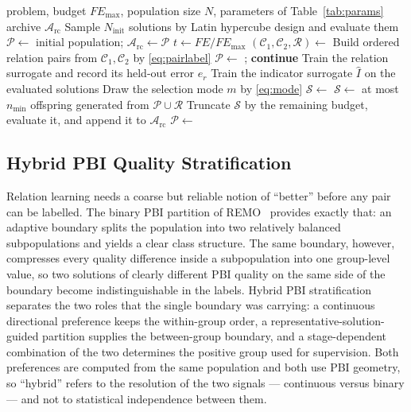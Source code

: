 \documentclass[final,5p,times,twocolumn]{elsarticle}
\begin{document}
\begin{algorithm}[t]
\caption{HPDC-MaOEA}
\label{alg:framework}
\begin{algorithmic}[1]
\Require problem, budget $FE_{\max}$, population size $N$, parameters of
         Table~\ref{tab:params}
\Ensure archive $\mathcal{A}_{\mathrm{rc}}$
\State Sample $N_{\mathrm{init}}$ solutions by Latin hypercube design and
       evaluate them
\State $\mathcal{P}\gets$ initial population;
       $\mathcal{A}_{\mathrm{rc}}\gets\mathcal{P}$
  \State $t\gets FE/FE_{\max}$
  \State $(\mathcal{C}_1,\mathcal{C}_2,\mathcal{R})\gets$
  \State Build ordered relation pairs from $\mathcal{C}_1,\mathcal{C}_2$ by
         \eqref{eq:pairlabel}
    \State $\mathcal{P}\gets$
           ;
           \textbf{continue}
  \EndIf
  \State Train the relation surrogate and record its held-out error $e_r$
  \State Train the indicator surrogate $\widehat I$ on the evaluated solutions
  \State Draw the selection mode $m$ by \eqref{eq:mode}
  \State $\mathcal{S}\gets$
    \State $\mathcal{S}\gets$ at most $n_{\min}$ offspring generated from
           $\mathcal{P}\cup\mathcal{R}$
  \EndIf
  \State Truncate $\mathcal{S}$ by the remaining budget, evaluate it, and
         append it to $\mathcal{A}_{\mathrm{rc}}$
  \State $\mathcal{P}\gets$ 
\EndWhile
\end{algorithmic}
\end{algorithm}

\subsection{Hybrid PBI Quality Stratification}
\label{sec:method:hpc}

Relation learning needs a coarse but reliable notion of ``better'' before any
pair can be labelled. The binary PBI partition of REMO~\cite{ref:remo} provides
exactly that: an adaptive boundary splits the population into two relatively
balanced subpopulations and yields a clear class structure. The same boundary,
however, compresses every quality difference inside a subpopulation into one
group-level value, so two solutions of clearly different PBI quality on the same
side of the boundary become indistinguishable in the labels. Hybrid PBI
stratification separates the two roles that the single boundary was carrying: a
continuous directional preference keeps the within-group order, a
representative-solution-guided partition supplies the between-group boundary,
and a stage-dependent combination of the two determines the positive group used
for supervision. Both preferences are computed from the same population and
both use PBI geometry, so ``hybrid'' refers to the resolution of the two
signals --- continuous versus binary --- and not to statistical independence
between them.
\end{document}
